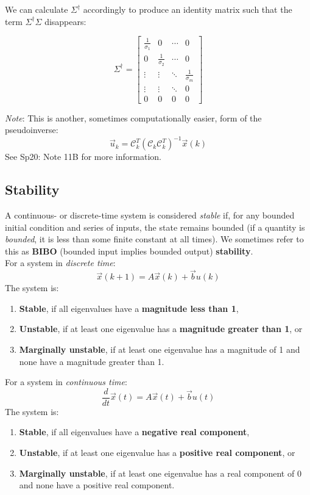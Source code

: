 We can calculate $\Sigma^{\dagger}$ accordingly to produce an identity matrix such that the term $\Sigma^{\dagger}\Sigma$ disappears:

$$\Sigma^{\dagger} = \begin{bmatrix} \frac{1}{\sigma_{1}} & 0 &  \cdots & 0 \\ 0 & \frac{1}{\sigma_{2}} & \cdots & 0 \\ \vdots & \vdots & \ddots & \frac{1}{\sigma_{m}} \\ 
    \vdots & \vdots & \ddots & 0 \\ 0 & 0 & 0 & 0 \end{bmatrix}$$

\textit{Note}: This is another, sometimes computationally easier, form of the pseudoinverse:
$$\vec{u}_k = \mathcal{C}_k^T(\mathcal{C}_k\mathcal{C}_k^T)^{-1}\vec{x}(k)$$
See Sp20: Note 11B for more information.

\subsection*{Stability}
A continuous- or discrete-time system is considered \textit{stable} if, for any bounded initial condition and series of inputs, the state remains bounded (if a quantity is \textit{bounded}, it is less than some finite constant at all times). We sometimes refer to this as \textbf{BIBO} (bounded input implies bounded output) \textbf{stability}. \\
\newline
For a system in \textit{discrete time}:
$$\vec{x}(k + 1) = A\vec{x}(k) + \vec{b}u(k)$$
The system is:
\begin{enumerate}
    \item \textbf{Stable}, if all eigenvalues have a \textbf{magnitude less than 1},
    \item \textbf{Unstable}, if at least one eigenvalue has a \textbf{magnitude greater than 1}, or
    \item \textbf{Marginally unstable}, if at least one eigenvalue has a magnitude of 1 and none have a magnitude greater than 1.
\end{enumerate}

For a system in \textit{continuous time}:
$$\frac{d}{dt} \vec{x}(t) = A\vec{x}(t) + \vec{b}u(t)$$
The system is:
\begin{enumerate}
    \item \textbf{Stable}, if all eigenvalues have a \textbf{negative real component},
    \item \textbf{Unstable}, if at least one eigenvalue has a \textbf{positive real component}, or
    \item \textbf{Marginally unstable}, if at least one eigenvalue has a real component of 0 and none have a positive real component.
\end{enumerate}

